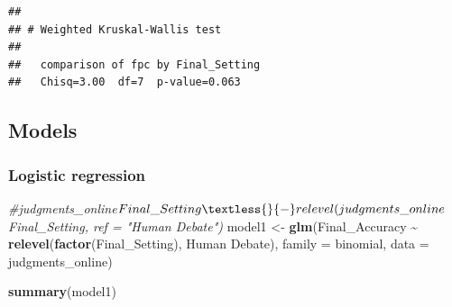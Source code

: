 \documentclass[
]{article}
\newenvironment{Shaded}{\begin{snugshade}}{\end{snugshade}}
\newcommand{\AttributeTok}[1]{\textcolor[rgb]{0.13,0.29,0.53}{#1}}
\newcommand{\CommentTok}[1]{\textcolor[rgb]{0.56,0.35,0.01}{\textit{#1}}}
\newcommand{\FunctionTok}[1]{\textcolor[rgb]{0.13,0.29,0.53}{\textbf{#1}}}
\newcommand{\NormalTok}[1]{#1}
\newcommand{\OtherTok}[1]{\textcolor[rgb]{0.56,0.35,0.01}{#1}}
\newcommand{\SpecialCharTok}[1]{\textcolor[rgb]{0.81,0.36,0.00}{\textbf{#1}}}
\newcommand{\StringTok}[1]{\textcolor[rgb]{0.31,0.60,0.02}{#1}}
\begin{document}
\begin{verbatim}
## 
## # Weighted Kruskal-Wallis test
## 
##   comparison of fpc by Final_Setting
##   Chisq=3.00  df=7  p-value=0.063
\end{verbatim}

\subsection{Models}\label{models}

\subsubsection{Logistic regression}\label{logistic-regression}

\begin{Shaded}
\begin{Highlighting}[]
\CommentTok{\#judgments\_online$Final\_Setting \textless{}{-} relevel(judgments\_online$Final\_Setting, ref = "Human Debate")}
\NormalTok{model1 }\OtherTok{\textless{}{-}} \FunctionTok{glm}\NormalTok{(Final\_Accuracy }\SpecialCharTok{\textasciitilde{}} \FunctionTok{relevel}\NormalTok{(}\FunctionTok{factor}\NormalTok{(Final\_Setting), }\StringTok{\textquotesingle{}Human Debate\textquotesingle{}}\NormalTok{), }\AttributeTok{family =} \StringTok{\textquotesingle{}binomial\textquotesingle{}}\NormalTok{, }\AttributeTok{data =}\NormalTok{ judgments\_online)}

\FunctionTok{summary}\NormalTok{(model1)}
\end{Highlighting}
\end{Shaded}
\end{document}
